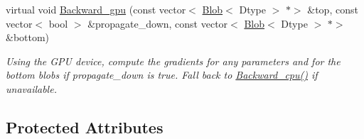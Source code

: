 \begin{DoxyCompactItemize}
virtual void \mbox{\hyperlink{classcaffe_1_1_accuracy_layer_a4cd3015639d107e63f90672733ac019a}{Backward\+\_\+gpu}} (const vector$<$ \mbox{\hyperlink{classcaffe_1_1_blob}{Blob}}$<$ Dtype $>$ $\ast$$>$ \&top, const vector$<$ bool $>$ \&propagate\+\_\+down, const vector$<$ \mbox{\hyperlink{classcaffe_1_1_blob}{Blob}}$<$ Dtype $>$ $\ast$$>$ \&bottom)
\begin{DoxyCompactList}\small\item\em Using the G\+PU device, compute the gradients for any parameters and for the bottom blobs if propagate\+\_\+down is true. Fall back to \mbox{\hyperlink{classcaffe_1_1_accuracy_layer_a8084d42629a751f5b6322d9cb3f5986c}{Backward\+\_\+cpu()}} if unavailable. \end{DoxyCompactList}\end{DoxyCompactItemize}
\subsection*{Protected Attributes}

